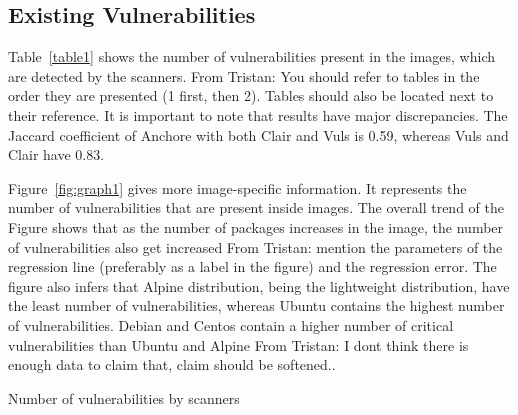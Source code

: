 \documentclass[a4paper,num-refs]{oup-contemporary}
\newcommand{\tristan}[1]{\color{blue}From Tristan: #1\color{black}}
\begin{document}
\subsection{Existing Vulnerabilities}

Table~\ref{table1} shows the number of vulnerabilities present in the images,
which are detected by the scanners.
\tristan{You should refer to tables in the order they are presented (1
first, then 2). Tables should also be located next to their reference.}
It is important to note that results have major discrepancies.
The Jaccard coefficient of Anchore with both Clair and Vuls is 0.59,
whereas Vuls and Clair have 0.83.

Figure~\ref{fig:graph1} gives more image-specific information.
It represents the number of vulnerabilities that are present inside images.
The overall trend of the Figure shows that as the number of packages increases in the image, the number of vulnerabilities
also get increased \tristan{mention the parameters of the regression line (preferably as a label in the figure) and the regression error}.
The figure also infers that Alpine distribution, being the
lightweight distribution, have the least number of vulnerabilities, whereas Ubuntu contains the highest number of
vulnerabilities. Debian and Centos contain a higher number of critical vulnerabilities than Ubuntu and Alpine \tristan{I dont think there is enough data to 
claim that, claim should be softened.}.



\begin{table}[!ht]
%
       \centering
        \caption{\label{table1}Number of vulnerabilities by scanners}
\end{table}
\end{document}
